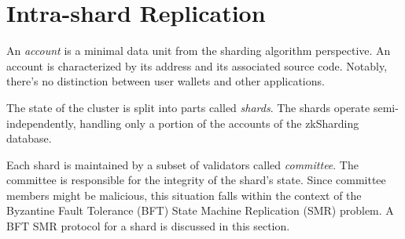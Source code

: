 \section{Intra-shard Replication}
\label{section:local-consensus}

An \textit{account} is a minimal data unit from the sharding 
algorithm perspective. An account is characterized by its address 
and its associated source code. Notably, there's no distinction between user 
wallets and other applications. 

The state of the cluster is split into parts called \emph{shards}.
The shards operate semi-independently, handling only a portion of the accounts of the zkSharding database.

Each shard is maintained by a subset of validators called \emph{committee}.
The committee is responsible for the integrity of the shard's state.
Since committee members might be malicious, 
 this situation falls within the context of the Byzantine Fault Tolerance (BFT) State Machine Replication (SMR) problem.
A BFT SMR protocol for a shard is discussed in this section.






